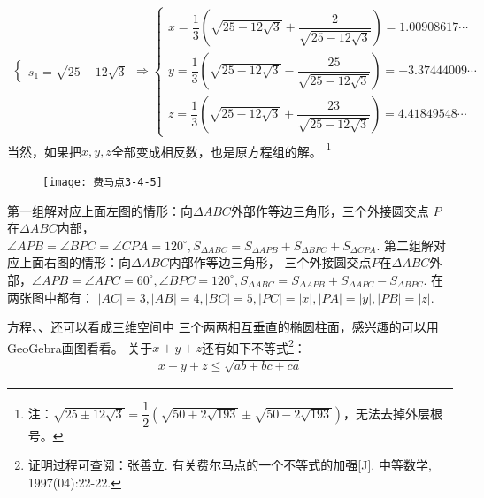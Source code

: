 \begin{enumerate}[label={【\textbf{例\thechapter.\arabic*}】},
 leftmargin=\inteval{\myenumleftmargin}pt,
 itemsep=\inteval{\myenumitempsep}pt,
 itemindent=\inteval{\myenumitemindent}pt]
\begin{align*}
\begin{cases}
        s_1=\sqrt{25 - 12\sqrt{3}}
    \end{cases}
    \Rightarrow 
    \begin{cases}
        x =\dfrac{1}{3}\left(\sqrt{25 - 12\sqrt{3}}+
        \dfrac{2}{\sqrt{25 - 12\sqrt{3}}}\right)=1.00908617 \cdots \\
        y =\dfrac{1}{3}\left(\sqrt{25 - 12\sqrt{3}}-
        \dfrac{25}{\sqrt{25 - 12\sqrt{3}}}\right)=-3.37444009 \cdots \\
        z =\dfrac{1}{3}\left(\sqrt{25 - 12\sqrt{3}}+
        \dfrac{23}{\sqrt{25 - 12\sqrt{3}}}\right)= 4.41849548 \cdots 
    \end{cases}
\end{align*}
当然，如果把$ x,y,z $全部变成相反数，也是原方程组的解。
\footnote{注：$ \sqrt{25\pm 12\sqrt{3}} =\dfrac{1}{2}\left(\sqrt{50+2\sqrt{193}}
    \pm \sqrt{50-2\sqrt{193}}\right) $，无法去掉外层根号。}

\begin{figure}[H]
    \centering
    \texttt{[image: 费马点3-4-5]}
\end{figure} 
第一组解对应上面左图的情形：向$ \Delta ABC $外部作等边三角形，三个外接圆交点
$ P $在$ \Delta ABC $内部，$ \angle APB=\angle BPC =\angle CPA
=120^{\circ} ,S_{\Delta ABC}=S_{\Delta APB}+S_{\Delta BPC}+S_{\Delta CPA}$.
第二组解对应上面右图的情形：向$ \Delta ABC $内部作等边三角形，
三个外接圆交点$ P $在$ \Delta ABC $外部，$ \angle APB=\angle APC
=60^{\circ},\angle BPC=120^{\circ},S_{\Delta ABC}=S_{\Delta APB}+
S_{\Delta APC}-S_{\Delta BPC} $. 在两张图中都有：
$ |AC|=3,|AB|=4,|BC|=5, |PC|=|x|,|PA|=|y|,|PB|=|z| $. 


方程、、还可以看成三维空间中
三个两两相互垂直的椭圆柱面，感兴趣的可以用GeoGebra画图看看。
关于$ x+y+z $还有如下不等式\footnote{证明过程可查阅：张善立.
    有关费尔马点的一个不等式的加强[J]. 中等数学, 1997(04):22-22.}：
\begin{gather*}
    x+y+z\leq \sqrt{ab+bc+ca}
\end{gather*} 


\end{enumerate}
